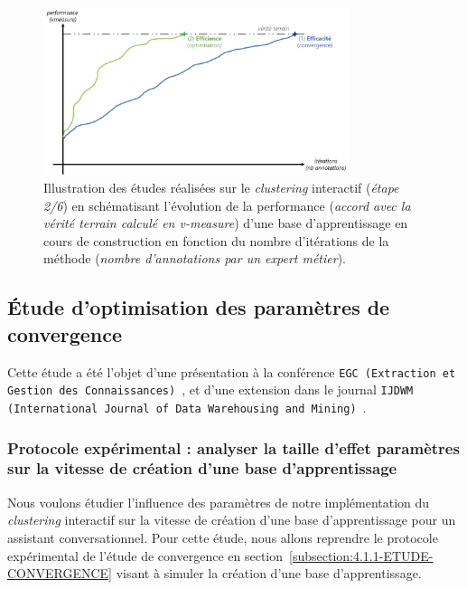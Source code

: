 \begin{tcolorbox}[
			title=\textbf{Hypothèse d'efficience},
			colback=gray!20,
			colframe=gray!50!black!75,
			width=\linewidth
		]
			\begin{figure}[H]
				\centering
				\includegraphics[width=0.8\textwidth]{figures/hypotheses-02-efficience}
				\caption{Illustration des études réalisées sur le \textit{clustering} interactif (\textit{étape 2/6}) en schématisant l'évolution de la performance (\textit{accord avec la vérité terrain calculé en v-measure}) d'une base d'apprentissage en cours de construction en fonction du nombre d'itérations de la méthode (\textit{nombre d'annotations par un expert métier}).}
				\label{figure:4.2-HYPOTHESE-EFFICIENCE}
			\end{figure}

		\end{tcolorbox}
		
		\subsection{Étude d'optimisation des paramètres de convergence}
		\label{subsection:4.2.1-ETUDE-OPTIMISATION}
				
			Cette étude a été l'objet d'une présentation à la conférence \texttt{EGC (Extraction et Gestion des Connaissances)}~\citep{schild:conception-interactive-clustering:2021}, et d'une extension dans le journal \texttt{IJDWM (International Journal of Data Warehousing and Mining)}~\citep{schild:extension-interactive-clustering:2022}.
	
			\subsubsection{Protocole expérimental : analyser la taille d'effet paramètres sur la vitesse de création d'une base d'apprentissage}

				Nous voulons étudier l'influence des paramètres de notre implémentation du \textit{clustering} interactif sur la vitesse de création d'une base d'apprentissage pour un assistant conversationnel.
				Pour cette étude, nous allons reprendre le protocole expérimental de l'étude de convergence en section~\ref{subsection:4.1.1-ETUDE-CONVERGENCE} visant à simuler la création d'une base d'apprentissage.
				
